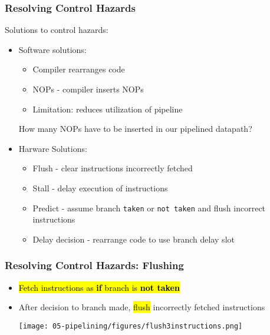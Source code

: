 \begin{frame}\frametitle{Resolving Control Hazards}
Solutions to control hazards:
\begin{itemize}
\item Software solutions:
    \begin{itemize}
    \item Compiler rearranges code 
        \item NOPs - compiler inserts NOPs
        \item Limitation: reduces utilization of pipeline
    \end{itemize}
    \begin{tcolorbox}[enhanced,attach boxed title to top center={yshift=-3mm,yshifttext=-1mm},
  colback=green!5!white,colframe=green!75!black,colbacktitle=green!80!black,
  title=Remember It,fonttitle=\bfseries,
  boxed title style={size=small,colframe=green!50!black} ]
How many NOPs have to be inserted in our pipelined datapath?
\ifnum{}\fi
\end{tcolorbox}
\item Harware Solutions:
\begin{itemize}
\item Flush - clear instructions incorrectly fetched
    \item Stall - delay execution of instructions
\item Predict - assume branch {\tt taken} or {\tt not taken}  and flush incorrect instructions 
\item Delay decision - rearrange code to use branch delay slot
\end{itemize}
\end{itemize}
\end{frame}
\begin{frame}\frametitle{Resolving Control Hazards: Flushing}
\begin{itemize}
    \item \hl{Fetch instructions as \textbf{if} branch is \textbf{not taken}}
    \item After decision to branch made, \hl{flush} incorrectly fetched instructions
    
    \texttt{[image: 05-pipelining/figures/flush3instructions.png]}
\end{itemize}

\end{frame}

